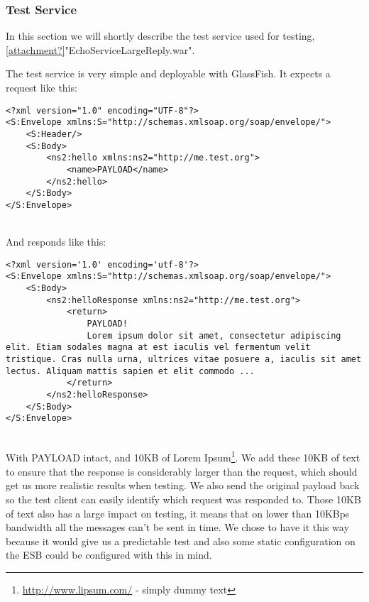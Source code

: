 \subsubsection{Test Service}\label{Testing:About:Service}
    In this section we will shortly describe the test service used for testing, \ref{attachment?}"EchoServiceLargeReply.war".

    The test service is very simple and deployable with GlassFish. It expects a request like this:
    \lstset{language=xml}
    \begin{lstlisting}
<?xml version="1.0" encoding="UTF-8"?>
<S:Envelope xmlns:S="http://schemas.xmlsoap.org/soap/envelope/">
    <S:Header/>
    <S:Body>
        <ns2:hello xmlns:ns2="http://me.test.org">
            <name>PAYLOAD</name>
        </ns2:hello>
    </S:Body>
</S:Envelope>
    \end{lstlisting}
    \\
    And responds like this:
    \begin{lstlisting}
<?xml version='1.0' encoding='utf-8'?>
<S:Envelope xmlns:S="http://schemas.xmlsoap.org/soap/envelope/">
    <S:Body>
        <ns2:helloResponse xmlns:ns2="http://me.test.org">
            <return>
                PAYLOAD!
                Lorem ipsum dolor sit amet, consectetur adipiscing elit. Etiam sodales magna at est iaculis vel fermentum velit tristique. Cras nulla urna, ultrices vitae posuere a, iaculis sit amet lectus. Aliquam mattis sapien et elit commodo ...
            </return>
        </ns2:helloResponse>
    </S:Body>
</S:Envelope>
    \end{lstlisting}
    \\
    With PAYLOAD intact, and 10KB of Lorem Ipsum\footnote{\url{http://www.lipsum.com/} - simply dummy text}. We add these 10KB of text to ensure that the response is considerably larger than the request, which should get us more realistic results when testing. We also send the original payload back so the test client can easily identify which request was responded to. Those 10KB of text also has a large impact on testing, it means that on lower than 10KBps bandwidth all the messages can't be sent in time. We chose to have it this way because it would give us a predictable test and also some static configuration on the ESB could be configured with this in mind.
